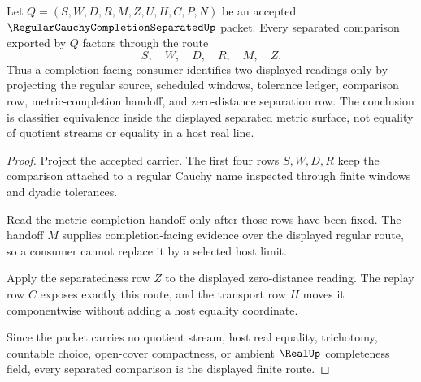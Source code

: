 \begin{theorem}
\label{thm:regular-cauchy-completion-separated-separation-route}
Let $Q=(S,W,D,R,M,Z,U,H,C,P,N)$ be an accepted $\RegularCauchyCompletionSeparatedUp$ packet. Every separated comparison exported by $Q$ factors through the route
$$
S,\quad W,\quad D,\quad R,\quad M,\quad Z .
$$
Thus a completion-facing consumer identifies two displayed readings only by projecting the regular source, scheduled windows, tolerance ledger, comparison row, metric-completion handoff, and zero-distance separation row. The conclusion is classifier equivalence inside the displayed separated metric surface, not equality of quotient streams or equality in a host real line.
\end{theorem}
\begin{proof}
Project the accepted carrier. The first four rows $S,W,D,R$ keep the comparison attached to a regular Cauchy name inspected through finite windows and dyadic tolerances.

Read the metric-completion handoff only after those rows have been fixed. The handoff $M$ supplies completion-facing evidence over the displayed regular route, so a consumer cannot replace it by a selected host limit.

Apply the separatedness row $Z$ to the displayed zero-distance reading. The replay row $C$ exposes exactly this route, and the transport row $H$ moves it componentwise without adding a host equality coordinate.

Since the packet carries no quotient stream, host real equality, trichotomy, countable choice, open-cover compactness, or ambient $\RealUp$ completeness field, every separated comparison is the displayed finite route.
\end{proof}

